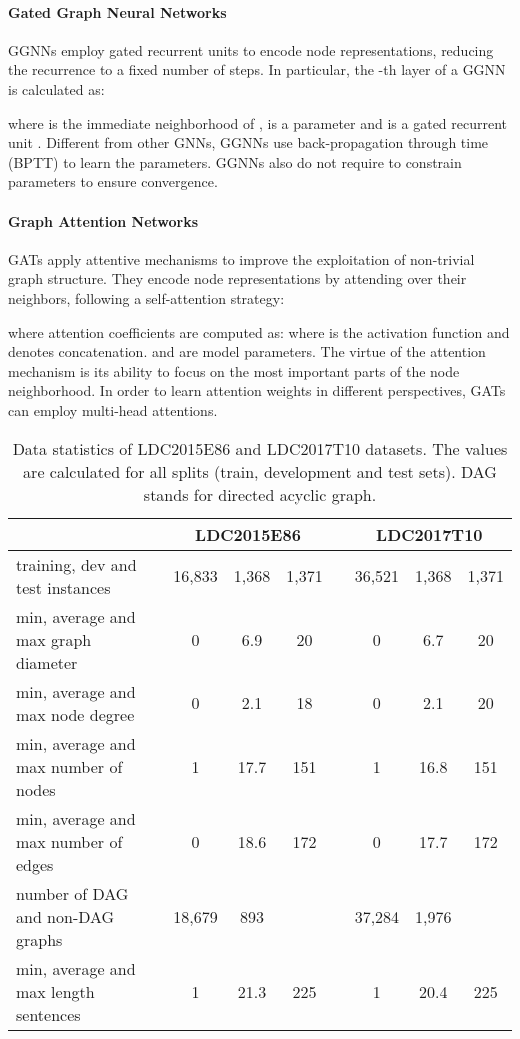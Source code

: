 \documentclass[11pt,a4paper]{article}
\begin{document}
\paragraph{Gated Graph Neural Networks}
 GGNNs employ gated recurrent units to encode node representations, reducing the recurrence to a fixed number of steps. In particular, the -th layer of a GGNN is calculated as:

where  is the immediate neighborhood of ,  is a parameter and  is a gated recurrent unit \cite{cho-etal-2014-learning}. Different from other GNNs, GGNNs use back-propagation through time (BPTT) to learn the parameters. GGNNs also do not require to constrain parameters to ensure convergence.

\paragraph{Graph Attention Networks}
GATs apply attentive mechanisms to improve the exploitation of non-trivial graph structure. They encode node representations by attending over their neighbors, following a self-attention strategy:

where attention coefficients  are computed as:
{\small
}
where  is the activation function and  denotes concatenation.  and  are model parameters. The virtue of the attention mechanism is its ability to focus on the most important parts of the node neighborhood. In order to learn attention weights in different perspectives, GATs can employ multi-head attentions.

\begin{table*}[t]
\begin{center}
 \begin{tabular}{p{6.5cm} c c c p{0.4cm} c c c}  
 \hline
 &  \multicolumn{3}{c}{\textbf{LDC2015E86}} & & \multicolumn{3}{c}{\textbf{LDC2017T10}} \\
 \hline
 training, dev and test instances & 16,833 & 1,368 & 1,371 & & 36,521 & 1,368 & 1,371 \\
 min, average and max graph diameter & 0 & 6.9 & 20 & & 0 & 6.7 & 20 \\
 min, average and max node degree & 0 & 2.1 & 18 & & 0 & 2.1 & 20 \\
 min, average and max number of nodes & 1 & 17.7 & 151 & & 1 & 16.8 & 151 \\
  min, average and max number of edges & 0 & 18.6 & 172 & & 0 & 17.7 & 172 \\
   number of DAG and non-DAG graphs & 18,679 & 893 & & & 37,284 & 1,976 &\\
 min, average and max length sentences & 1 & 21.3 & 225 & & 1 & 20.4 & 225 \\
 
  \hline
\end{tabular}
\caption{Data statistics of LDC2015E86 and LDC2017T10 datasets. The values are calculated for all splits (train, development and test sets). DAG stands for directed acyclic graph.}
\label{tab:datasets}
\end{center}
\end{table*}
\end{document}
